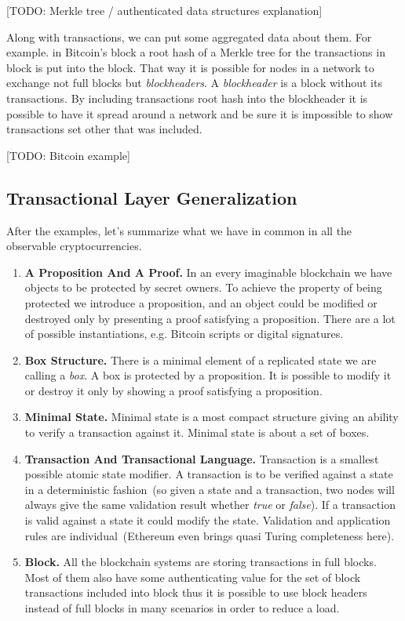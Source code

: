 \documentclass[]{report}   %
\begin{document}
[TODO: Merkle tree / authenticated data structures explanation]

Along with transactions, we can put some aggregated data about them. For example. in Bitcoin's block a root hash of a Merkle tree for the transactions in block is put into the block. That way it is possible for nodes in a network to exchange not full blocks but \textit{blockheaders}. A \textit{blockheader} is a block without its transactions. By including transactions root hash into the blockheader it is possible to have it spread around a network and be sure it is impossible to show transactions set other that was included. 

[TODO: Bitcoin example]

\subsection{Transactional Layer Generalization}

After the examples, let's summarize what we have in common in all the observable cryptocurrencies.

\begin{enumerate}
\item{\textbf{A Proposition And A Proof.}}
In an every imaginable blockchain we have objects to be protected by secret owners. To achieve the property of being protected we introduce a proposition, and an object could be modified or destroyed only by presenting a proof satisfying a proposition. There are a lot of possible instantiations, e.g. Bitcoin scripts or digital signatures. 
\item{\textbf{Box Structure.}}
There is a minimal element of a replicated state we are calling a \textit{box}. A box is protected by a proposition. It is possible to modify it or destroy it only by showing a proof satisfying a proposition. 
\item{\textbf{Minimal State.}}
Minimal state is a most compact structure giving an ability to verify a transaction against it. Minimal state is about a set of boxes. 
\item{\textbf{Transaction And Transactional Language.}}
Transaction is a smallest possible atomic state modifier. A transaction is to be verified against a state in a deterministic fashion~(so given a state and a transaction, two nodes will always give the same validation result whether \textit{true} or \textit{false}). If a transaction is valid against a state it could modify the state. Validation and application rules are individual~(Ethereum even brings quasi Turing completeness here).
\item{\textbf{Block.}}
All the blockchain systems are storing transactions in full blocks. Most of them also have some authenticating value for the set of block transactions included into block thus it is possible to use block headers instead of full blocks in many scenarios in order to reduce a load.
\end{enumerate}
\end{document}
